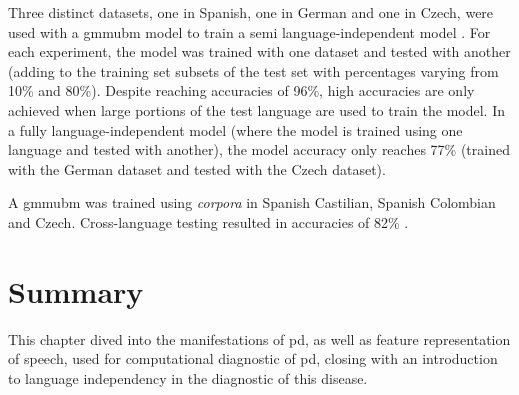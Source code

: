 Three distinct datasets, one in Spanish, one in German and one in Czech, were used with a \gls{gmmubm} model to train a semi language-independent model \cite{parkinson_three_languages}. For each experiment, the model was trained with one dataset and tested with another (adding to the training set subsets of the test set with percentages varying from 10\% and 80\%). Despite reaching accuracies of 96\%, high accuracies are only achieved when large portions of the test language are used to train the model. In a fully language-independent model (where the model is trained using one language and tested with another), the model accuracy only reaches 77\% (trained with the German dataset and tested with the Czech dataset).

A \gls{gmmubm} was trained using \textit{corpora} in Spanish Castilian, Spanish Colombian and Czech. Cross-language testing resulted in accuracies of 82\% \cite{parkinson_phonemic_relevance}.

\section{Summary}

This chapter dived into the manifestations of \gls{pd}, as well as feature representation of speech, used for computational diagnostic of \gls{pd}, closing with an introduction to language independency in the diagnostic of this disease.


